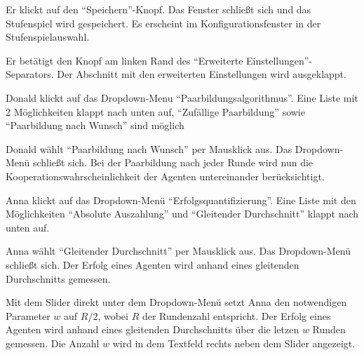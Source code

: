 \documentclass[parskip=full,11pt]{scrartcl}
\begin{document}
{Er klickt auf den \enquote{Speichern}-Knopf.}
{Das Fenster schließt sich und das Stufenspiel wird gespeichert. Es erscheint im Konfigurationsfenster in der Stufenspielauswahl.}


{Er betätigt den Knopf am linken Rand des \enquote{Erweiterte Einstellungen}-Separators.}
{Der Abschnitt mit den erweiterten Einstellungen wird ausgeklappt.}

{Donald klickt auf das Dropdown-Menu \enquote{Paarbildungsalgorithmus}.}
{Eine Liste mit 2 Möglichkeiten klappt nach unten auf, \enquote{Zufällige Paarbildung} sowie \enquote{Paarbildung nach Wunsch} sind möglich}

{Donald wählt  \enquote{Paarbildung nach Wunsch} per Mausklick aus.}
{Das Dropdown-Menü schließt sich. Bei der Paarbildung nach jeder Runde wird nun die Kooperationswahrscheinlichkeit der Agenten untereinander berücksichtigt.}


{Anna klickt auf das Dropdown-Menü \enquote{Erfolgsquantifizierung}.}
{Eine Liste mit den Möglichkeiten \enquote{Absolute Auszahlung} und  \enquote{Gleitender Durchschnitt} klappt nach unten auf.}

{Anna wählt \enquote{Gleitender Durchschnitt} per Mausklick aus.}
{Das Dropdown-Menü schließt sich. Der Erfolg eines Agenten wird anhand eines gleitenden Durchschnitts gemessen.}

{Mit dem Slider direkt unter dem Dropdown-Menü setzt Anna den notwendigen Parameter \(w\) auf \(R/2\), wobei \(R\) der Rundenzahl entspricht.}
{Der Erfolg eines Agenten wird anhand eines gleitenden Durchschnitts über die letzen \(w\) Runden gemessen. Die Anzahl \(w\) wird in dem Textfeld rechts neben dem Slider angezeigt.}
\end{document}
